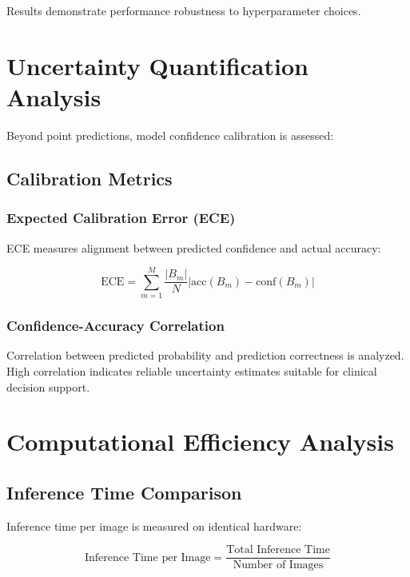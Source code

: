 Results demonstrate performance robustness to hyperparameter choices.

\section{Uncertainty Quantification Analysis}

Beyond point predictions, model confidence calibration is assessed:

\subsection{Calibration Metrics}

\subsubsection{Expected Calibration Error (ECE)}

ECE measures alignment between predicted confidence and actual accuracy:

\begin{equation}
\text{ECE} = \sum_{m=1}^{M} \frac{|B_m|}{N} |\text{acc}(B_m) - \text{conf}(B_m)|
\end{equation}

\subsubsection{Confidence-Accuracy Correlation}

Correlation between predicted probability and prediction correctness is analyzed. High correlation indicates reliable uncertainty estimates suitable for clinical decision support.

\section{Computational Efficiency Analysis}

\subsection{Inference Time Comparison}

Inference time per image is measured on identical hardware:

\begin{equation}
\text{Inference Time per Image} = \frac{\text{Total Inference Time}}{\text{Number of Images}}
\end{equation}

